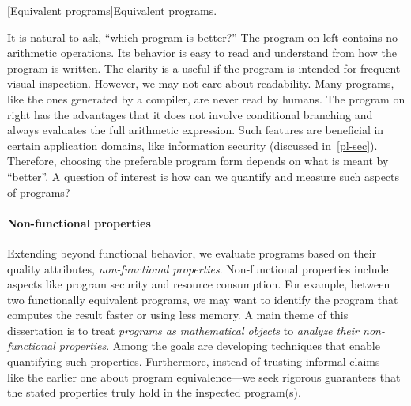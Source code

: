 \begin{center}
\captionsetup{type=lstlisting}
\begin{minipage}{.3\textwidth}

\end{minipage}%
\hspace{5em}%
\begin{minipage}{.4\textwidth}
\captionsetup{type=lstlisting}

\end{minipage}
[Equivalent programs]{Equivalent programs.}
\label{lst:intro}
\end{center}

It is natural to ask, \enquote{which program is better?} The program on left
contains no arithmetic operations. Its behavior is easy to read and understand
from how the program is written. The clarity is a useful if the program is
intended for frequent visual inspection. However, we may not care about
readability. Many programs, like the ones generated by a compiler, are never
read by humans. The program on right has the advantages that it does not involve
conditional branching and always evaluates the full arithmetic expression. Such
features are beneficial in certain application domains, like information
security (discussed in~\autoref{pl-sec}). Therefore, choosing the preferable
program form depends on what is meant by \enquote{better}. A question of
interest is how can we quantify and measure such aspects of programs?

\paragraph*{Non-functional properties}
Extending beyond functional behavior, we evaluate programs based on their
quality attributes, \ie \emph{non-functional properties}. Non-functional properties include aspects like program security and
resource consumption. For example, between two functionally equivalent programs,
we may want to identify the program that computes the result faster or using
less memory. A main theme of this dissertation is to treat \emph{programs as
mathematical objects} to \emph{analyze their non-functional properties}. Among
the goals are developing techniques that enable quantifying such properties.
Furthermore, instead of trusting informal claims---like the earlier one about
program equivalence---we seek rigorous guarantees that the stated properties
truly hold in the inspected program(s).

